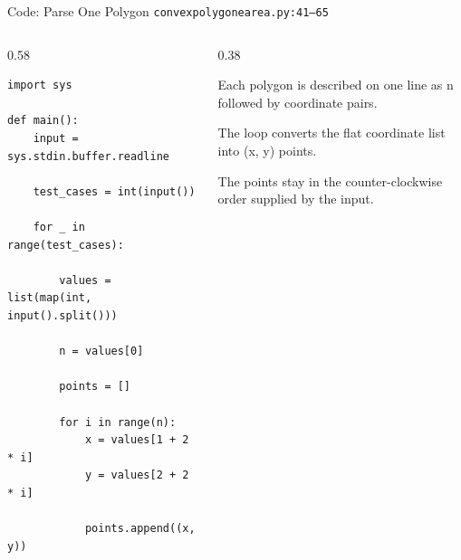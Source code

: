 \documentclass[aspectratio=169,11pt]{beamer}
\begin{document}
\begin{frame}[fragile]{Code: Parse One Polygon}
\scriptsize
{} \texttt{convexpolygonearea.py:41--65}

\vspace{0.08cm}
\begin{columns}[T,totalwidth=\textwidth]
\begin{column}{0.58\textwidth}
\begin{lstlisting}[style=cpcode]
import sys

def main():
    input = sys.stdin.buffer.readline

    test_cases = int(input())

    for _ in range(test_cases):

        values = list(map(int, input().split()))

        n = values[0]

        points = []

        for i in range(n):
            x = values[1 + 2 * i]
            y = values[2 + 2 * i]

            points.append((x, y))
\end{lstlisting}
\end{column}
\begin{column}{0.38\textwidth}
\begin{tightitemize}
  \item Each polygon is described on one line as n followed by coordinate pairs.
  \item The loop converts the flat coordinate list into (x, y) points.
  \item The points stay in the counter-clockwise order supplied by the input.
\end{tightitemize}
\end{column}
\end{columns}
\end{frame}
\end{document}
